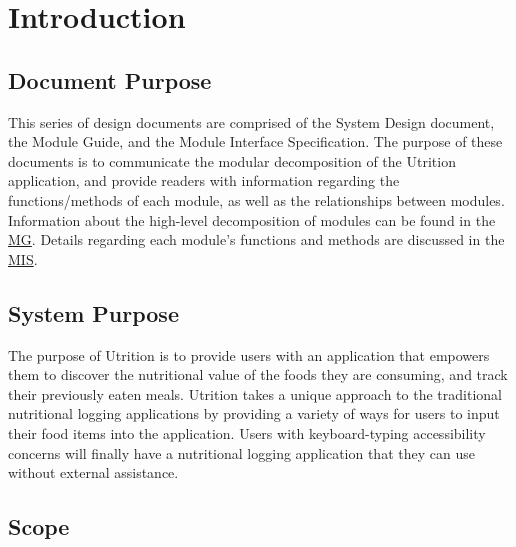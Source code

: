 \documentclass[12pt, titlepage]{article}
\begin{document}
\newpage

\tableofcontents

\listoftables

\listoffigures

\newpage


\section{Introduction}


\subsection{Document Purpose}

This series of design documents are comprised of the System Design document, 
the Module Guide, and the Module Interface Specification. The purpose of these 
documents is to communicate the modular decomposition of 
the Utrition application, and provide readers with information regarding the 
functions/methods of each module, as well as the relationships between modules. 
Information about the high-level decomposition of modules can be found in 
the \href{../SoftArchitecture/MG.pdf}{MG}.
Details regarding each module's functions and methods are discussed in 
the \href{../SoftDetailedDes/MIS.pdf}{MIS}.

\subsection{System Purpose}

The purpose of Utrition is to provide users with an application that empowers 
them to discover the nutritional value of the foods they are consuming, and track
their previously eaten meals. Utrition takes a unique approach to the traditional nutritional logging applications by providing a variety of ways for users to input their food items into the application. Users with keyboard-typing accessibility concerns will finally have a nutritional logging application that they can use without external assistance.



\subsection{Scope}
\end{document}
